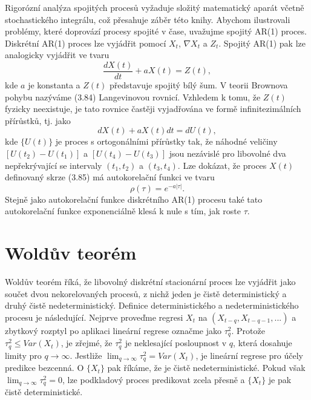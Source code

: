 Rigorózní analýza spojitých procesů vyžaduje složitý matematický aparát včetně stochastického integrálu, což přesahuje záběr této knihy. Abychom ilustrovali problémy, které doprovází procesy spojité v čase, uvažujme spojitý AR(1) proces. Diskrétní AR(1) proces lze vyjádřit pomocí $X_t$, $\nabla X_t$ a $Z_t$. Spojitý AR(1) pak lze analogicky vyjádřit ve tvaru
\begin{equation}
\frac{d X(t)}{dt} + a X(t) = Z(t),
\end{equation}
kde $a$ je konstanta a $Z(t)$ představuje spojitý bílý šum. V teorii Brownova pohybu nazýváme (3.84) Langevinovou rovnicí. Vzhledem k tomu, že $Z(t)$ fyzicky neexistuje, je tato rovnice častěji vyjadřována ve formě infinitezimálních přírůstků, tj. jako
\begin{equation}
d X(t) + a X(t)dt = dU(t),
\end{equation}
kde $\{U(t)\}$ je proces s ortogonálními přírůstky tak, že  náhodné veličiny $[U(t_2) - U(t_1)]$ a $[U(t_4) - U(t_3)]$ jsou nezávislé pro libovolné dva nepřekrývající se intervaly $(t_1, t_2)$ a $(t_3, t_4)$. Lze dokázat, že proces $X(t)$ definovaný skrze (3.85) má autokorelační funkci ve tvaru
\begin{equation}
\rho(\tau) = e^{-a |\tau|}.
\end{equation}
Stejně jako autokorelační funkce diskrétního AR(1) procesu také tato autokorelační funkce exponenciálně klesá k nule s tím, jak roste $\tau$.

\section{Woldův teorém}

Woldův teorém říká, že libovolný diskrétní stacionární proces lze vyjádřit jako součet dvou nekorelovaných procesů, z nichž jeden je čistě deterministický a druhý čistě nedeterministický. Definice deterministického a nedeterministického procesu je následující. Nejprve proveďme regresi $X_t$ na $(X_{t - q}, X_{t - q - 1}, ...)$ a zbytkový rozptyl po aplikaci lineární regrese označme jako $\tau_q^2$. Protože $\tau_q^2 \le Var(X_t)$, je zřejmé, že $\tau_q^2$ je neklesající posloupnost v $q$, která dosahuje limity pro $q \rightarrow \infty$. Jestliže $\lim_{q \rightarrow \infty} \tau_q^2 = Var(X_t)$, je lineární regrese pro účely predikce bezcenná. O $\{X_t\}$ pak říkáme, že je čistě nedeterministické. Pokud však $\lim_{q \rightarrow \infty} \tau_q^2 = 0$, lze podkladový proces predikovat zcela přesně a $\{X_t\}$ je pak čistě deterministické.


